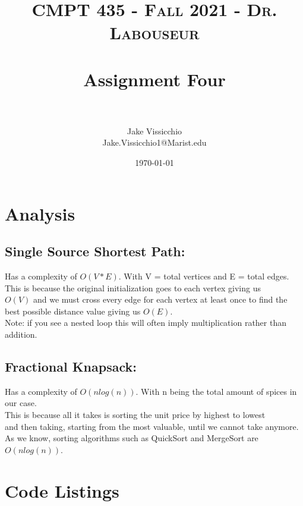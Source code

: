 \documentclass[letterpaper, 10pt]{article}
\title{	
   \normalfont\normalsize 
   \textsc{CMPT 435 - Fall 2021 - Dr. Labouseur} \\[10pt] %
   \horrule{0.5pt} \\[0.25cm] 	%
   \huge Assignment Four \\   %
   \horrule{0.5pt} \\[0.25cm] 	%
}
\author{Jake Vissicchio \\ \normalsize Jake.Vissicchio1@Marist.edu}
\date{\normalsize\today} 	%
\begin{document}
\maketitle %



\section{Analysis}
\noindent
\subsection{Single Source Shortest Path:}
Has a complexity of $O(V*E)$. With V = total vertices and
E = total edges.\\
This is because the original initialization goes to each vertex giving us\\
$O(V)$ and we must cross every edge for each vertex at least once to find the \\ best possible distance value giving us  $O(E)$.\\
Note: if you see a nested loop this will often imply multiplication rather than\\
addition.\\

\subsection{Fractional Knapsack:}
Has a complexity of $O(nlog(n))$. With n being the total amount of spices in \\
our case.\\
This is because all it takes is sorting the unit price by highest to lowest\\
and then taking, starting from the most valuable, until we cannot take anymore.\\
As we know, sorting algorithms such as QuickSort and MergeSort are $O(nlog(n))$.

\section{Code Listings}
\noindent
\end{document}
